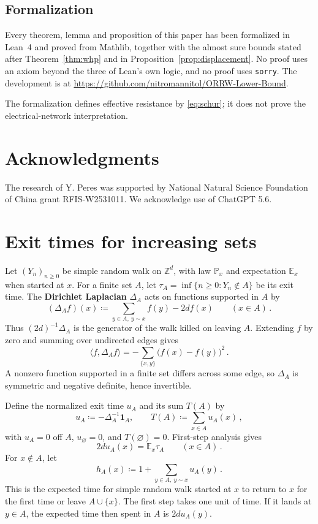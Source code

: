 \documentclass[11pt]{amsart}
\theoremstyle{plain}
\theoremstyle{definition}
\newcommand{\Z}{\mathbb Z}
\renewcommand{\P}{\mathbb P}
\newcommand{\E}{\mathbb E}
\newcommand{\one}{\mathbf 1}
\newcommand{\defn}[1]{\textbf{#1}}
\begin{document}
	\subsection{Formalization}\label{ssec:formalization}

	Every theorem, lemma and proposition of this paper has been formalized in
	Lean~4 and proved from Mathlib, together with the almost sure bounds stated
	after Theorem~\ref{thm:whp} and in Proposition~\ref{prop:displacement}.  No
	proof uses an axiom beyond the three of Lean's own logic, and no proof uses
	\texttt{sorry}.  The development is at
	\url{https://github.com/nitromannitol/ORRW-Lower-Bound}.

	The formalization defines effective resistance by \eqref{eq:schur};
	it does not prove the electrical-network interpretation.

	\section*{Acknowledgments}
	The research of Y. Peres was supported by National Natural Science Foundation of China grant
	RFIS-W2531011.  We acknowledge use of ChatGPT 5.6.

	\section{Exit times for increasing sets}\label{sec:insertion}

	Let $(Y_n)_{n\geq0}$ be simple random walk on $\Z^d$, with law $\P_x$ and
	expectation $\E_x$ when started at $x$. For a finite set $A$, let
	$\tau_A=\inf\{n\geq0:Y_n\notin A\}$ be its exit time. The
	\defn{Dirichlet Laplacian} $\Delta_A$ acts on functions supported in $A$ by
	\[
	(\Delta_Af)(x)\coloneqq\sum_{y\in A,\ y\sim x}f(y)-2df(x)
	\qquad(x\in A)\, .
	\]
	Thus $(2d)^{-1}\Delta_A$ is the generator of the walk killed on leaving
	$A$. Extending $f$ by zero and summing over undirected edges gives
	\[
	\langle f,\Delta_Af\rangle=-\sum_{\{x,y\}}\bigl(f(x)-f(y)\bigr)^2\, .
	\]
	A nonzero function supported in a finite set differs across some edge,
	so $\Delta_A$ is symmetric and negative definite, hence invertible.

	Define the normalized exit time $u_A$ and its sum $T(A)$ by
	\[
	u_A\coloneqq-\Delta_A^{-1}\one_A,
	\qquad T(A)\coloneqq\sum_{x\in A}u_A(x)\, ,
	\]
	with $u_A=0$ off $A$, $u_\varnothing=0$, and $T(\varnothing)=0$.
	First-step analysis gives
	\begin{equation}\label{eq:mean-steps}
		2du_A(x)=\E_x\tau_A
		\qquad(x\in A)\, .
	\end{equation}
	For $x\notin A$, let
	\begin{equation}\label{eq:h-def}
		h_A(x)\coloneqq1+\sum_{y\in A,\ y\sim x}u_A(y)\, .
	\end{equation}
	This is the expected time for simple random walk started at $x$ to return
	to $x$ for the first time or leave $A\cup\{x\}$. The first step takes one unit of time.
	If it lands at $y\in A$, the expected time then spent in $A$ is $2du_A(y)$.
\end{document}

